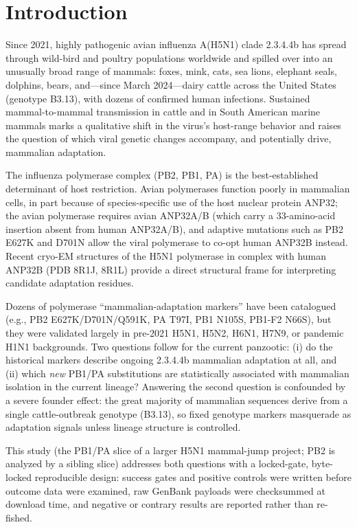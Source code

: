 \documentclass[11pt]{article}
\begin{document}
\newpage
\tableofcontents
\newpage

\section{Introduction}
Since 2021, highly pathogenic avian influenza A(H5N1) clade 2.3.4.4b has spread through wild-bird and poultry populations worldwide and spilled over into an unusually broad range of mammals: foxes, mink, cats, sea lions, elephant seals, dolphins, bears, and---since March 2024---dairy cattle across the United States (genotype B3.13), with dozens of confirmed human infections. Sustained mammal-to-mammal transmission in cattle and in South American marine mammals marks a qualitative shift in the virus's host-range behavior and raises the question of which viral genetic changes accompany, and potentially drive, mammalian adaptation.

The influenza polymerase complex (PB2, PB1, PA) is the best-established determinant of host restriction. Avian polymerases function poorly in mammalian cells, in part because of species-specific use of the host nuclear protein ANP32; the avian polymerase requires avian ANP32A/B (which carry a 33-amino-acid insertion absent from human ANP32A/B), and adaptive mutations such as PB2 E627K and D701N allow the viral polymerase to co-opt human ANP32B instead. Recent cryo-EM structures of the H5N1 polymerase in complex with human ANP32B (PDB 8R1J, 8R1L) provide a direct structural frame for interpreting candidate adaptation residues.

Dozens of polymerase ``mammalian-adaptation markers'' have been catalogued (e.g., PB2 E627K/D701N/Q591K, PA T97I, PB1 N105S, PB1-F2 N66S), but they were validated largely in pre-2021 H5N1, H5N2, H6N1, H7N9, or pandemic H1N1 backgrounds. Two questions follow for the current panzootic: (i) do the historical markers describe ongoing 2.3.4.4b mammalian adaptation at all, and (ii) which \emph{new} PB1/PA substitutions are statistically associated with mammalian isolation in the current lineage? Answering the second question is confounded by a severe founder effect: the great majority of mammalian sequences derive from a single cattle-outbreak genotype (B3.13), so fixed genotype markers masquerade as adaptation signals unless lineage structure is controlled.

This study (the PB1/PA slice of a larger H5N1 mammal-jump project; PB2 is analyzed by a sibling slice) addresses both questions with a locked-gate, byte-locked reproducible design: success gates and positive controls were written before outcome data were examined, raw GenBank payloads were checksummed at download time, and negative or contrary results are reported rather than re-fished.
\end{document}
